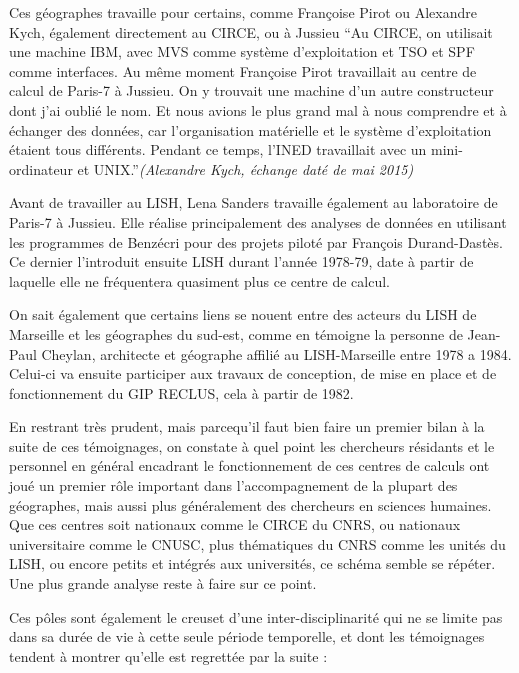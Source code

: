 Ces géographes travaille pour certains, comme Françoise Pirot ou Alexandre Kych, également directement au CIRCE, ou à Jussieu \enquote{Au CIRCE, on utilisait une machine IBM, avec MVS comme système d'exploitation et TSO et SPF comme interfaces. Au même moment Françoise Pirot travaillait au centre de calcul de Paris-7 à Jussieu. On y trouvait une machine d'un autre constructeur dont j'ai oublié le nom. Et nous avions le plus grand mal à nous comprendre et à échanger des données, car l'organisation matérielle et le système d'exploitation étaient tous différents. Pendant ce temps, l'INED travaillait avec un mini-ordinateur et UNIX.}\textit{(Alexandre Kych, échange daté de mai 2015)}

Avant de travailler au LISH, Lena Sanders travaille également au laboratoire de Paris-7 à Jussieu. Elle réalise principalement des analyses de données en utilisant les programmes de Benzécri pour des projets piloté par François Durand-Dastès. Ce dernier l'introduit ensuite LISH durant l'année 1978-79, date à partir de laquelle elle ne fréquentera quasiment plus ce centre de calcul.

On sait également que certains liens se nouent entre des acteurs du LISH de Marseille et les géographes du sud-est, comme en témoigne la personne de Jean-Paul Cheylan, architecte et géographe affilié au LISH-Marseille entre 1978 a 1984. Celui-ci va ensuite participer aux travaux de conception, de mise en place et de fonctionnement du GIP RECLUS, cela à partir de 1982.

En restrant très prudent, mais parcequ'il faut bien faire un premier bilan à la suite de ces témoignages, on constate à quel point les chercheurs résidants et le personnel en général encadrant le fonctionnement de ces centres de calculs ont joué un premier rôle important dans l’accompagnement de la plupart des géographes, mais aussi plus généralement des chercheurs en sciences humaines. Que ces centres soit nationaux comme le CIRCE du CNRS, ou nationaux universitaire comme le CNUSC, plus thématiques du CNRS comme les unités du LISH, ou encore petits et intégrés aux universités, ce schéma semble se répéter. Une plus grande analyse reste à faire sur ce point.

Ces pôles sont également le creuset d'une inter-disciplinarité qui ne se limite pas dans sa durée de vie à cette seule période temporelle, et dont les témoignages tendent à montrer qu'elle est regrettée par la suite :

